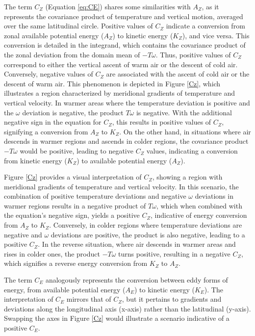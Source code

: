 The term $C_Z$ (Equation \ref{eq:CE}) shares some similarities with $A_Z$, as it represents the covariance product of temperature and vertical motion, averaged over the same latitudinal circle. Positive values of $C_Z$ indicate a conversion from zonal available potential energy ($A_Z$) to kinetic energy ($K_Z$), and vice versa. This conversion is detailed in the integrand, which contains the covariance product of the zonal deviation from the domain mean of $-T\omega$. Thus, positive values of $C_Z$ correspond to either the vertical ascent of warm air or the descent of cold air. Conversely, negative values of $C_Z$ are associated with the ascent of cold air or the descent of warm air. This phenomenon is depicted in Figure \ref{Cz}, which illustrates a region characterized by meridional gradients of temperature and vertical velocity. In warmer areas where the temperature deviation is positive and the $\omega$ deviation is negative, the product $T\omega$ is negative. With the additional negative sign in the equation for $C_Z$, this results in positive values of $C_Z$, signifying a conversion from $A_Z$ to $K_Z$. On the other hand, in situations where air descends in warmer regions and ascends in colder regions, the covariance product $-T\omega$ would be positive, leading to negative $C_Z$ values, indicating a conversion from kinetic energy ($K_Z$) to available potential energy ($A_Z$).

Figure \ref{Cz} provides a visual interpretation of $C_Z$, showing a region with meridional gradients of temperature and vertical velocity. In this scenario, the combination of positive temperature deviations and negative $\omega$ deviations in warmer regions results in a negative product of $T\omega$, which when combined with the equation's negative sign, yields a positive $C_Z$, indicative of energy conversion from $A_Z$ to $K_Z$. Conversely, in colder regions where temperature deviations are negative and $\omega$ deviations are positive, the product is also negative, leading to a positive $C_Z$. In the reverse situation, where air descends in warmer areas and rises in colder ones, the product $-T\omega$ turns positive, resulting in a negative $C_Z$, which signifies a reverse energy conversion from $K_Z$ to $A_Z$.

The term $C_E$ analogously represents the conversion between eddy forms of energy, from available potential energy ($A_E$) to kinetic energy ($K_E$). The interpretation of $C_E$ mirrors that of $C_Z$, but it pertains to gradients and deviations along the longitudinal axis (x-axis) rather than the latitudinal (y-axis). Swapping the axes in Figure \ref{Cz} would illustrate a scenario indicative of a positive $C_E$.

